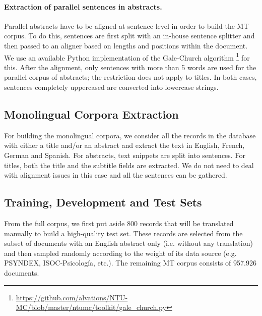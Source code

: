 \documentclass[a4paper,11pt]{article}
\begin{document}
\paragraph{Extraction of parallel sentences in abstracts.}

Parallel abstracts have to be aligned at sentence level in order to build the MT corpus. To do this, sentences are first split with an in-house sentence splitter and then passed to an aligner based on lengths and positions within the document. We use an available Python implementation of the Gale-Church algorithm%
\footnote{\url{https://github.com/alvations/NTU-MC/blob/master/ntumc/toolkit/gale_church.py}} \cite{galeChurch:1993} for this. After the alignment, only sentences with more than 5 words are used for the parallel corpus of abstracts; the restriction does not apply to titles. In both cases, sentences completely uppercased are converted into lowercase strings.



\subsection{Monolingual Corpora Extraction}
\label{ss:pubMono}

For building the monolingual corpora, we consider all the records in the database with either a title and/or an abstract and extract the text in English, French, German and Spanish. For abstracts, text snippets are split into sentences. For titles, both the title and the subtitle fields are extracted. We do not need to deal with alignment issues in this case and all the sentences can be gathered.



\subsection{Training, Development and Test Sets}
\label{ss:pubSets}


From the full corpus, we first put aside 800 records that will be translated manually to build a high-quality test set. These records are selected from the subset of documents with an English abstract only (i.e. without any translation) and then sampled randomly according to the weight of its data source (e.g. PSYNDEX, ISOC-Psicología, etc.). The remaining MT corpus consists of 957.926 documents.
\end{document}
